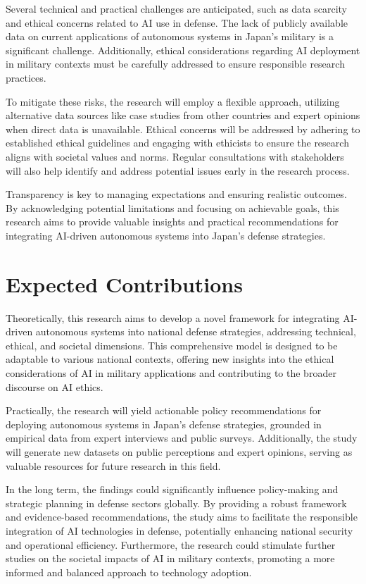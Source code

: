 \documentclass{article} %
\begin{document}
Several technical and practical challenges are anticipated, such as data scarcity and ethical concerns related to AI use in defense. The lack of publicly available data on current applications of autonomous systems in Japan's military is a significant challenge. Additionally, ethical considerations regarding AI deployment in military contexts must be carefully addressed to ensure responsible research practices.

To mitigate these risks, the research will employ a flexible approach, utilizing alternative data sources like case studies from other countries and expert opinions when direct data is unavailable. Ethical concerns will be addressed by adhering to established ethical guidelines and engaging with ethicists to ensure the research aligns with societal values and norms. Regular consultations with stakeholders will also help identify and address potential issues early in the research process.

Transparency is key to managing expectations and ensuring realistic outcomes. By acknowledging potential limitations and focusing on achievable goals, this research aims to provide valuable insights and practical recommendations for integrating AI-driven autonomous systems into Japan's defense strategies.

\section{Expected Contributions}
\label{sec:contributions}

Theoretically, this research aims to develop a novel framework for integrating AI-driven autonomous systems into national defense strategies, addressing technical, ethical, and societal dimensions. This comprehensive model is designed to be adaptable to various national contexts, offering new insights into the ethical considerations of AI in military applications and contributing to the broader discourse on AI ethics.

Practically, the research will yield actionable policy recommendations for deploying autonomous systems in Japan's defense strategies, grounded in empirical data from expert interviews and public surveys. Additionally, the study will generate new datasets on public perceptions and expert opinions, serving as valuable resources for future research in this field.

In the long term, the findings could significantly influence policy-making and strategic planning in defense sectors globally. By providing a robust framework and evidence-based recommendations, the study aims to facilitate the responsible integration of AI technologies in defense, potentially enhancing national security and operational efficiency. Furthermore, the research could stimulate further studies on the societal impacts of AI in military contexts, promoting a more informed and balanced approach to technology adoption.
\end{document}
